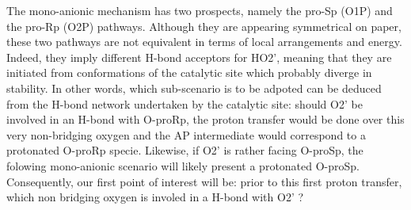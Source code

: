 \documentclass[journal=jacsat,manuscript=article]{achemso}
\begin{document}

The mono-anionic mechanism has two prospects, namely the pro-Sp (O1P) and the pro-Rp (O2P) pathways.
Although they are appearing symmetrical on paper, these two pathways are not equivalent in terms of local arrangements and energy.
Indeed, they imply different H-bond acceptors for HO2', 
meaning that they are initiated from conformations of the catalytic site which probably diverge in stability. 
In other words, which sub-scenario is to be adpoted can be deduced from the H-bond network undertaken by the catalytic site:
should O2' be involved in an H-bond with O-proRp, the proton transfer would be done over this very non-bridging oxygen and the AP intermediate would correspond to a protonated O-proRp specie.
Likewise, if O2' is rather facing O-proSp, the folowing mono-anionic scenario will likely present a protonated O-proSp. 
Consequently, our first point of interest will be: prior to this first proton transfer, which non bridging oxygen is involed in a H-bond with O2' ? 






\end{document}
